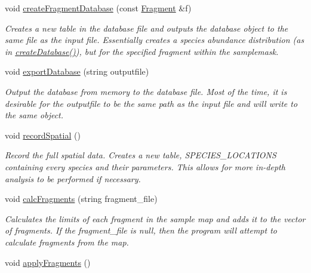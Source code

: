 \begin{DoxyCompactItemize}
void \hyperlink{class_treelist_aba14303915c31c334e1d63ae61c3812c}{create\+Fragment\+Database} (const \hyperlink{struct_fragment}{Fragment} \&f)
\begin{DoxyCompactList}\small\item\em Creates a new table in the database file and outputs the database object to the same file as the input file. Essentially creates a species abundance distribution (as in \hyperlink{class_treelist_a3416c2a81ee64b98b3d7956f58a8132d}{create\+Database()}), but for the specified fragment within the samplemask. \end{DoxyCompactList}\item 
void \hyperlink{class_treelist_a3f7f7eb4526ee91180742010394e0f65}{export\+Database} (string outputfile)
\begin{DoxyCompactList}\small\item\em Output the database from memory to the database file. Most of the time, it is desirable for the outputfile to be the same path as the input file and will write to the same object. \end{DoxyCompactList}\item 
void \hyperlink{class_treelist_a3bba0e4657b3c98025331ae6c76d2a14}{record\+Spatial} ()\hypertarget{class_treelist_a3bba0e4657b3c98025331ae6c76d2a14}{}\label{class_treelist_a3bba0e4657b3c98025331ae6c76d2a14}

\begin{DoxyCompactList}\small\item\em Record the full spatial data. Creates a new table, S\+P\+E\+C\+I\+E\+S\+\_\+\+L\+O\+C\+A\+T\+I\+O\+NS containing every species and their parameters. This allows for more in-\/depth analysis to be performed if necessary. \end{DoxyCompactList}\item 
void \hyperlink{class_treelist_ac0569d1ff2167b24751e490d7d76ac9f}{calc\+Fragments} (string fragment\+\_\+file)
\begin{DoxyCompactList}\small\item\em Calculates the limits of each fragment in the sample map and adds it to the vector of fragments. If the fragment\+\_\+file is null, then the program will attempt to calculate fragments from the map. \end{DoxyCompactList}\item 
void \hyperlink{class_treelist_a40ce2abdada3090379f75ac0532e9ea0}{apply\+Fragments} ()\hypertarget{class_treelist_a40ce2abdada3090379f75ac0532e9ea0}{}\label{class_treelist_a40ce2abdada3090379f75ac0532e9ea0}


\end{DoxyCompactItemize}
